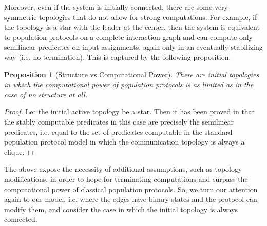 \documentclass[preprint]{elsarticle}
\newtheorem{proposition}{Proposition}
\begin{document}
Moreover, even if the system is initially connected, there are some very symmetric topologies that do not allow for strong computations. For example, if the topology is a star with the leader at the center, then the system is equivalent to population protocols on a complete interaction graph and can compute only semilinear predicates on input assignments, again only in an eventually-stabilizing way (i.e. no termination). This is captured by the following proposition.

\begin{proposition} [Structure vs Computational Power]
There are initial topologies in which the computational power of population protocols is as limited as in the case of no structure at all.
\end{proposition}
\begin{proof}
Let the initial active topology be a star. Then it has been proved in \cite{CMNS13} that the stably computable predicates in this case are precisely the semilinear predicates, i.e. equal to the set of predicates computable in the standard population protocol model in which the communication topology is always a clique. 
\end{proof}

The above expose the necessity of additional assumptions, such as topology modifications, in order to hope for terminating computations and surpass the computational power of classical population protocols. So, we turn our attention again to our model, i.e. where the edges have binary states and the protocol can modify them, and consider the case in which the initial topology is always connected.
\end{document}
